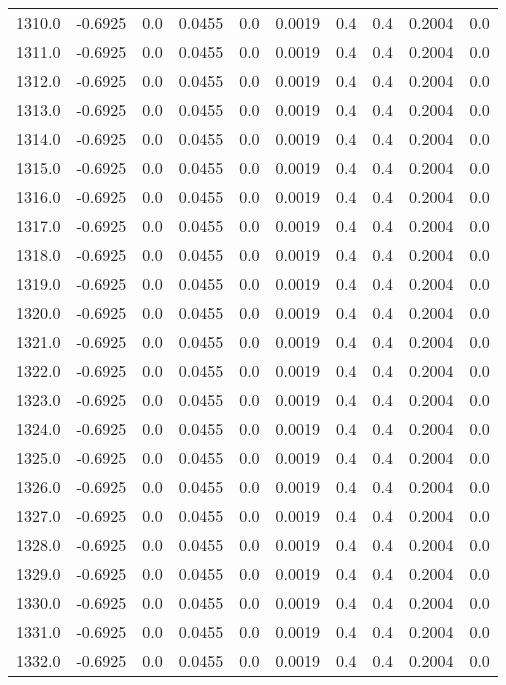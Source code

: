 \begin{longtable}{lrrrrrrrrr}
1310.0 & -0.6925 & 0.0 & 0.0455 & 0.0 & 0.0019 & 0.4 & 0.4 & 0.2004 & 0.0 \\
1311.0 & -0.6925 & 0.0 & 0.0455 & 0.0 & 0.0019 & 0.4 & 0.4 & 0.2004 & 0.0 \\
1312.0 & -0.6925 & 0.0 & 0.0455 & 0.0 & 0.0019 & 0.4 & 0.4 & 0.2004 & 0.0 \\
1313.0 & -0.6925 & 0.0 & 0.0455 & 0.0 & 0.0019 & 0.4 & 0.4 & 0.2004 & 0.0 \\
1314.0 & -0.6925 & 0.0 & 0.0455 & 0.0 & 0.0019 & 0.4 & 0.4 & 0.2004 & 0.0 \\
1315.0 & -0.6925 & 0.0 & 0.0455 & 0.0 & 0.0019 & 0.4 & 0.4 & 0.2004 & 0.0 \\
1316.0 & -0.6925 & 0.0 & 0.0455 & 0.0 & 0.0019 & 0.4 & 0.4 & 0.2004 & 0.0 \\
1317.0 & -0.6925 & 0.0 & 0.0455 & 0.0 & 0.0019 & 0.4 & 0.4 & 0.2004 & 0.0 \\
1318.0 & -0.6925 & 0.0 & 0.0455 & 0.0 & 0.0019 & 0.4 & 0.4 & 0.2004 & 0.0 \\
1319.0 & -0.6925 & 0.0 & 0.0455 & 0.0 & 0.0019 & 0.4 & 0.4 & 0.2004 & 0.0 \\
1320.0 & -0.6925 & 0.0 & 0.0455 & 0.0 & 0.0019 & 0.4 & 0.4 & 0.2004 & 0.0 \\
1321.0 & -0.6925 & 0.0 & 0.0455 & 0.0 & 0.0019 & 0.4 & 0.4 & 0.2004 & 0.0 \\
1322.0 & -0.6925 & 0.0 & 0.0455 & 0.0 & 0.0019 & 0.4 & 0.4 & 0.2004 & 0.0 \\
1323.0 & -0.6925 & 0.0 & 0.0455 & 0.0 & 0.0019 & 0.4 & 0.4 & 0.2004 & 0.0 \\
1324.0 & -0.6925 & 0.0 & 0.0455 & 0.0 & 0.0019 & 0.4 & 0.4 & 0.2004 & 0.0 \\
1325.0 & -0.6925 & 0.0 & 0.0455 & 0.0 & 0.0019 & 0.4 & 0.4 & 0.2004 & 0.0 \\
1326.0 & -0.6925 & 0.0 & 0.0455 & 0.0 & 0.0019 & 0.4 & 0.4 & 0.2004 & 0.0 \\
1327.0 & -0.6925 & 0.0 & 0.0455 & 0.0 & 0.0019 & 0.4 & 0.4 & 0.2004 & 0.0 \\
1328.0 & -0.6925 & 0.0 & 0.0455 & 0.0 & 0.0019 & 0.4 & 0.4 & 0.2004 & 0.0 \\
1329.0 & -0.6925 & 0.0 & 0.0455 & 0.0 & 0.0019 & 0.4 & 0.4 & 0.2004 & 0.0 \\
1330.0 & -0.6925 & 0.0 & 0.0455 & 0.0 & 0.0019 & 0.4 & 0.4 & 0.2004 & 0.0 \\
1331.0 & -0.6925 & 0.0 & 0.0455 & 0.0 & 0.0019 & 0.4 & 0.4 & 0.2004 & 0.0 \\
1332.0 & -0.6925 & 0.0 & 0.0455 & 0.0 & 0.0019 & 0.4 & 0.4 & 0.2004 & 0.0 \\

\end{longtable}
